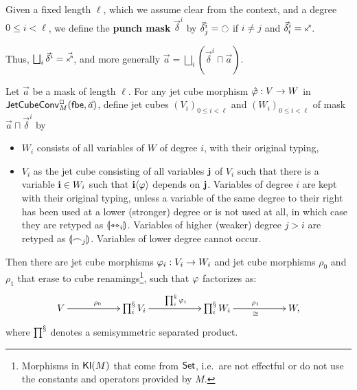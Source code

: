 \documentclass[a4paper]{memoir}
\begin{document}
\begin{definition}
	Given a fixed length $\ell$, which we assume clear from the context, and a degree $0 \leq i < \ell$, we define the \textbf{punch mask} $\vec \delta^i$ by $\vec \delta^i_j = \npolar$ if $i \neq j$ and $\vec \delta^i_i = \ypolar$.
\end{definition}
Thus, $\bigsqcup_i \vec \delta^i = \vec{\ypolar}$, and more generally $\vec a = \bigsqcup_i (\vec \delta^i \sqcap \vec a)$.
\begin{theorem} \label{sssfactorization}
	Let $\vec a$ be a mask of length $\ell$.
	For any jet cube morphism $\hat {\varphi} : V \to W$ in $\mathsf{JetCubeConv}^{\Box}_{M}\mathopen{}\left( {\mathsf{fbe}},\vec a \right)\mathclose{}$, define jet cubes $(V_i)_{0 \leq i < \ell}$ and $(W_i)_{0 \leq i < \ell}$ of mask $\vec a \sqcap \vec \delta^i$ by
	\begin{itemize}
		\item $W_i$ consists of all variables of $W$ of degree $i$, with their original typing,
		\item $V_i$ as the jet cube consisting of all variables $\mathbf{j}$ of $V_i$ such that there is a variable $\mathbf{i} \in W_i$ such that $\mathbf{i} \langle \varphi \rangle$ depends on $\mathbf{j}$. Variables of degree $i$ are kept with their original typing, unless a variable of the same degree to their right has been used at a lower (stronger) degree or is not used at all, in which case they are retyped as ${\llparenthesis \leftrightarrowtriangle_i \rrparenthesis}$. Variables of higher (weaker) degree $j>i$ are retyped as ${\llparenthesis \frown_j \rrparenthesis}$. Variables of lower degree cannot occur.
	\end{itemize}
	Then there are jet cube morphisms $\varphi_i : V_i \to W_i$ and jet cube morphisms $\rho_0$ and $\rho_1$ that erase to cube renamings\footnote{Morphisms in ${\mathsf{Kl}}(M)$ that come from ${\mathsf{Set}}$, i.e.\ are not effectful or do not use the constants and operators provided by $M$.}, such that $\varphi$ factorizes as:
	\[
		\xymatrix{
			V
				\ar[rr]^{\rho_0}
			&& {\bigsss_i V_i}
				\ar[rr]^{\bigsss_i \vfi_i}
			&& {\bigsss_i W_i}
				\ar[rr]^{\rho_1}_\cong
			&& W,
		}
	\]
	where $\prod^{\mathbin{\mathsection}}$ denotes a semisymmetric separated product.
\end{theorem}
\end{document}
